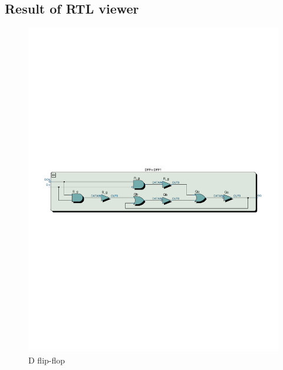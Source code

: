 \documentclass[13pt,a4paper]{report}
\begin{document}
\subsection{Result of RTL viewer}
\begin{figure}[H]
\centering
\includegraphics[scale=0.7, clip, trim={0cm 12cm 0cm 12.4cm}]{images/Exc4_DFF_RTL.pdf}
\caption*{D flip-flop}
\end{figure}
\end{document}
